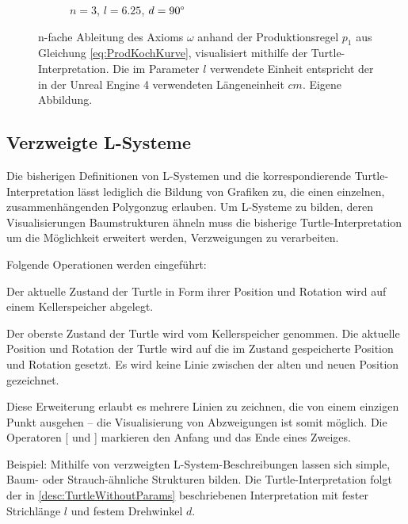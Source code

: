 \begin{figure} [hbtp]
\begin{subfigure}[t]{.3\textwidth}
		\caption{$n=3$, $l=6.25$, $d=90\degree$}
		\label{fig:KochkurveN3L6_25}
	\end{subfigure}
	\caption{n-fache Ableitung des Axioms $\omega$ anhand der Produktionsregel $p_1$ aus Gleichung \ref{eq:ProdKochKurve}, visualisiert mithilfe der Turtle-Interpretation. Die im Parameter $l$ verwendete Einheit entspricht der in der Unreal Engine 4 verwendeten Längeneinheit $cm$. Eigene Abbildung.}
	\label{fig:KochkurveAbleitung}
\end{figure}

\subsection{Verzweigte L-Systeme}

Die bisherigen Definitionen von L-Systemen und die korrespondierende Turtle-Interpretation lässt lediglich die Bildung von Grafiken zu, die einen einzelnen, zusammenhängenden Polygonzug erlauben. Um L-Systeme zu bilden, deren Visualisierungen Baumstrukturen ähneln muss die bisherige Turtle-Interpretation um die Möglichkeit erweitert werden, Verzweigungen zu verarbeiten. \cite[S.24]{ABOP:04} 

Folgende Operationen werden eingeführt:

\begin{description}[labelindent]
	\item[$\text{[}$] Der aktuelle Zustand der Turtle in Form ihrer Position und Rotation wird auf einem Kellerspeicher abgelegt. \\
	
	\item[$ \text{]} $] Der oberste Zustand der Turtle wird vom Kellerspeicher genommen. Die aktuelle Position und Rotation der Turtle wird auf die im Zustand gespeicherte Position und Rotation gesetzt. Es wird keine Linie zwischen der alten und neuen Position gezeichnet.
\end{description}
	\cite[S.24]{ABOP:04} 

Diese Erweiterung erlaubt es mehrere Linien zu zeichnen, die von einem einzigen Punkt ausgehen -- die Visualisierung von Abzweigungen ist somit möglich. Die Operatoren [ und ] markieren den Anfang und das Ende eines Zweiges.

Beispiel: Mithilfe von verzweigten L-System-Beschreibungen lassen sich simple, Baum- oder Strauch-ähnliche Strukturen bilden. Die Turtle-Interpretation folgt der in \ref{desc:TurtleWithoutParams} beschriebenen Interpretation mit fester Strichlänge $l$ und festem Drehwinkel $d$.


